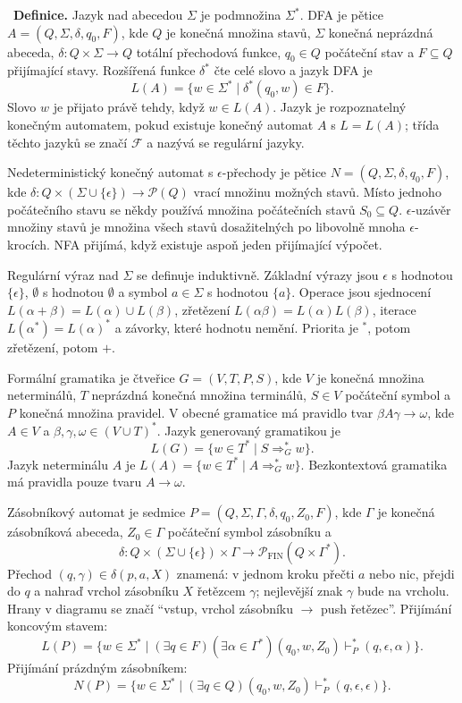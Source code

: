 \begin{odpoved}
\setlength{\parskip}{2pt}
\noindent{}\ \textbf{Definice.}
Jazyk nad abecedou $\Sigma$ je podmnožina $\Sigma^*$. DFA je pětice
$A=(Q,\Sigma,\delta,q_0,F)$, kde $Q$ je konečná množina stavů, $\Sigma$ konečná
neprázdná abeceda, $\delta:Q\times\Sigma\to Q$ totální přechodová funkce,
$q_0\in Q$ počáteční stav a $F\subseteq Q$ přijímající stavy. Rozšířená funkce
$\delta^*$ čte celé slovo a jazyk DFA je
\[
L(A)=\{w\in\Sigma^*\mid \delta^*(q_0,w)\in F\}.
\]
Slovo $w$ je přijato právě tehdy, když $w\in L(A)$. Jazyk je rozpoznatelný konečným
automatem, pokud existuje konečný automat $A$ s $L=L(A)$; třída těchto jazyků se značí
$\mathcal F$ a nazývá se regulární jazyky.

Nedeterministický konečný automat s $\epsilon$-přechody je pětice
$N=(Q,\Sigma,\delta,q_0,F)$, kde
$\delta:Q\times(\Sigma\cup\{\epsilon\})\to\mathcal P(Q)$ vrací množinu možných stavů.
Místo jednoho počátečního stavu se někdy používá množina počátečních stavů
$S_0\subseteq Q$. $\epsilon$-uzávěr množiny stavů je množina všech stavů dosažitelných
po libovolně mnoha $\epsilon$-krocích. NFA přijímá, když existuje aspoň jeden přijímající
výpočet.

Regulární výraz nad $\Sigma$ se definuje induktivně. Základní výrazy jsou
$\epsilon$ s hodnotou $\{\epsilon\}$, $\emptyset$ s hodnotou $\emptyset$ a symbol
$a\in\Sigma$ s hodnotou $\{a\}$. Operace jsou sjednocení
$L(\alpha+\beta)=L(\alpha)\cup L(\beta)$, zřetězení
$L(\alpha\beta)=L(\alpha)L(\beta)$, iterace $L(\alpha^*)=L(\alpha)^*$ a závorky,
které hodnotu nemění. Priorita je $^*$, potom zřetězení, potom $+$.

Formální gramatika je čtveřice $G=(V,T,P,S)$, kde $V$ je konečná množina neterminálů,
$T$ neprázdná konečná množina terminálů, $S\in V$ počáteční symbol a $P$ konečná
množina pravidel. V obecné gramatice má pravidlo tvar $\beta A\gamma\to\omega$,
kde $A\in V$ a $\beta,\gamma,\omega\in(V\cup T)^*$. Jazyk generovaný gramatikou je
\[
L(G)=\{w\in T^*\mid S\Rightarrow_G^* w\}.
\]
Jazyk neterminálu $A$ je $L(A)=\{w\in T^*\mid A\Rightarrow_G^* w\}$.
Bezkontextová gramatika má pravidla pouze tvaru $A\to\omega$.

Zásobníkový automat je sedmice $P=(Q,\Sigma,\Gamma,\delta,q_0,Z_0,F)$, kde
$\Gamma$ je konečná zásobníková abeceda, $Z_0\in\Gamma$ počáteční symbol zásobníku a
\[
\delta:Q\times(\Sigma\cup\{\epsilon\})\times\Gamma
\to \mathcal P_{\mathrm{FIN}}(Q\times\Gamma^*).
\]
Přechod $(q,\gamma)\in\delta(p,a,X)$ znamená: v jednom kroku přečti $a$ nebo nic,
přejdi do $q$ a nahraď vrchol zásobníku $X$ řetězcem $\gamma$; nejlevější znak
$\gamma$ bude na vrcholu. Hrany v diagramu se značí ``vstup, vrchol zásobníku
$\to$ push řetězec''. Přijímání koncovým stavem:
\[
L(P)=\{w\in\Sigma^*\mid(\exists q\in F)(\exists\alpha\in\Gamma^*)
(q_0,w,Z_0)\vdash_P^*(q,\epsilon,\alpha)\}.
\]
Přijímání prázdným zásobníkem:
\[
N(P)=\{w\in\Sigma^*\mid(\exists q\in Q)(q_0,w,Z_0)\vdash_P^*(q,\epsilon,\epsilon)\}.
\]


\end{odpoved}

